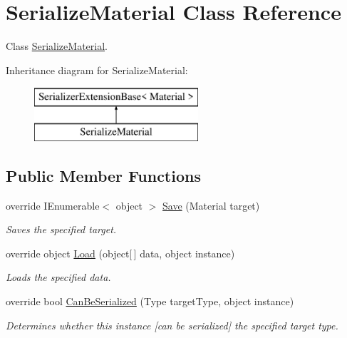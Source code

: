 \hypertarget{class_serialize_material}{}\section{Serialize\+Material Class Reference}
\label{class_serialize_material}


Class \hyperlink{class_serialize_material}{Serialize\+Material}.  


Inheritance diagram for Serialize\+Material\+:\begin{figure}[H]
\begin{center}
\leavevmode
\includegraphics[height=2.000000cm]{class_serialize_material}
\end{center}
\end{figure}
\subsection*{Public Member Functions}
\begin{DoxyCompactItemize}
\item 
override I\+Enumerable$<$ object $>$ \hyperlink{class_serialize_material_a9478a00c7ed2237f8fd8db4f190bd96c}{Save} (Material target)
\begin{DoxyCompactList}\small\item\em Saves the specified target. \end{DoxyCompactList}\item 
override object \hyperlink{class_serialize_material_ae371882b5aece27aafec190d488fc97f}{Load} (object\mbox{[}$\,$\mbox{]} data, object instance)
\begin{DoxyCompactList}\small\item\em Loads the specified data. \end{DoxyCompactList}\item 
override bool \hyperlink{class_serialize_material_a86d5a8507905179b0d5cc0ca608c552b}{Can\+Be\+Serialized} (Type target\+Type, object instance)
\begin{DoxyCompactList}\small\item\em Determines whether this instance \mbox{[}can be serialized\mbox{]} the specified target type. \end{DoxyCompactList}\end{DoxyCompactItemize}


